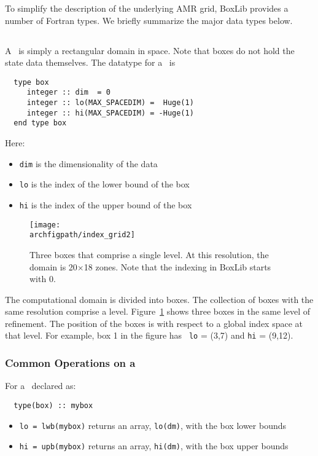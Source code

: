 To simplify the description of the underlying AMR grid, BoxLib
provides a number of Fortran types.  We briefly summarize the major
data types below.


\subsection{\boxtype}

A \boxtype\ is simply a rectangular domain in space.  Note that boxes
do not hold the state data themselves.  The datatype for a
\boxtype\ is
\begin{verbatim}
  type box
     integer :: dim  = 0
     integer :: lo(MAX_SPACEDIM) =  Huge(1)
     integer :: hi(MAX_SPACEDIM) = -Huge(1)
  end type box
\end{verbatim}

\noindent Here:
\begin{itemize}
\item {\tt dim} is the dimensionality of the data
\item {\tt lo} is the index of the lower bound of the box
\item {\tt hi} is the index of the upper bound of the box
\end{itemize}


\begin{figure}[h]
\centering
\texttt{[image: \\archfigpath/index\_grid2]}
\caption[Single-level grid structure]
{\label{fig:boxes} Three boxes that comprise a single level.  At this
  resolution, the domain is 20$\times$18 zones.  Note that the
  indexing in BoxLib starts with $0$.}
\end{figure}


The computational domain is divided into boxes.  The collection of
boxes with the same resolution comprise a level.
Figure~\ref{fig:boxes} shows three boxes in the same level of
refinement.  The position of the boxes is with respect to a global
index space at that level.  For example, box 1 in the figure has {\tt
  lo} = (3,7) and {\tt hi} = (9,12).


\subsubsection{Common Operations on a \boxtype}

For a \boxtype\ declared as:
\begin{verbatim}
  type(box) :: mybox
\end{verbatim}

\begin{itemize}

\item {\tt lo = lwb(mybox)} returns an array, {\tt lo(dm)}, with
     the box lower bounds

\item {\tt hi = upb(mybox)} returns an array, {\tt hi(dm)}, with
     the box upper bounds

\end{itemize}



